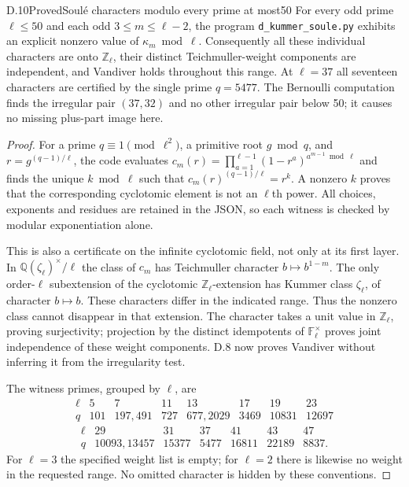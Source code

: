 \begin{statement}{D.10}{Proved}{Soulé characters modulo every prime at most50}
For every odd prime $\ell\leq50$ and each odd $3\leq m\leq\ell-2$, the program \texttt{d\_kummer\_soule.py} exhibits an explicit nonzero value of $\kappa_m\bmod\ell$. Consequently all these individual characters are onto $\mathbb Z_\ell$, their distinct Teichmuller-weight components are independent, and Vandiver holds throughout this range. At $\ell=37$ all seventeen characters are certified by the single prime $q=5477$. The Bernoulli computation finds the irregular pair $(37,32)$ and no other irregular pair below 50; it causes no missing plus-part image here.
\end{statement}
\begin{proof}
For a prime $q\equiv1\pmod{\ell^2}$, a primitive root $g\bmod q$, and $r=g^{(q-1)/\ell}$, the code evaluates
$c_m(r)=\prod_{a=1}^{\ell-1}(1-r^a)^{a^{m-1}\bmod\ell}$ and finds the unique $k\bmod\ell$ such that
$c_m(r)^{(q-1)/\ell}=r^k$. A nonzero $k$ proves that the corresponding cyclotomic element is not an $\ell$th power. All choices, exponents and residues are retained in the JSON, so each witness is checked by modular exponentiation alone.

This is also a certificate on the infinite cyclotomic field, not only at its first layer. In $\mathbb Q(\zeta_\ell)^\times/\ell$ the class of $c_m$ has Teichmuller character $b\mapsto b^{1-m}$. The only order-$\ell$ subextension of the cyclotomic $\mathbb Z_\ell$-extension has Kummer class $\zeta_\ell$, of character $b\mapsto b$. These characters differ in the indicated range. Thus the nonzero class cannot disappear in that extension. The character takes a unit value in $\mathbb Z_\ell$, proving surjectivity; projection by the distinct idempotents of $\mathbb F_\ell^\times$ proves joint independence of these weight components. D.8 now proves Vandiver without inferring it from the irregularity test.

The witness primes, grouped by $\ell$, are
\[
\begin{array}{c|rrrrrrr}
\ell&5&7&11&13&17&19&23\\\hline
q&101&197,491&727&677,2029&3469&10831&12697
\end{array}
\]
\[
\begin{array}{c|rrrrrr}
\ell&29&31&37&41&43&47\\\hline
q&10093,13457&15377&5477&16811&22189&8837.
\end{array}
\]
For $\ell=3$ the specified weight list is empty; for $\ell=2$ there is likewise no weight in the requested range. No omitted character is hidden by these conventions.
\end{proof}

